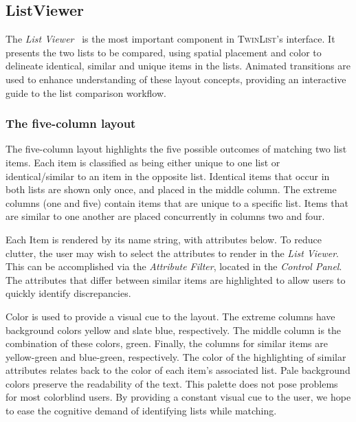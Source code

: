 \documentclass{chi2009}
\newcommand{\TwinList}{\textsc{TwinList}}
\newcommand{\ListViewer}{\textit{List Viewer}}
\newcommand{\Controls}{\textit{Control Panel}}
\newcommand{\AttributeFilter}{\textit{Attribute Filter}}
\begin{document}
\subsection{ListViewer}
The  \ListViewer~ is the most important component in \TwinList's interface. It presents the two lists to be compared, using spatial placement and color to delineate identical, similar and unique items in the lists. Animated transitions are used to enhance understanding of these layout concepts, providing an interactive guide to the list comparison workflow.

\subsubsection{The five-column layout}
The five-column layout highlights the five possible outcomes of matching two list items. Each item is classified as being either unique to one list or identical/similar to an item in the opposite list. Identical items that occur in both lists are shown only once, and placed in the middle column. The extreme columns (one and five) contain items that are unique to a specific list. Items that are similar to one another are placed concurrently in columns two and four.

Each Item is rendered by its name string, with attributes below. To reduce clutter, the user may wish to select the attributes to render in the \ListViewer. This can be accomplished via the \AttributeFilter, located in the \Controls. The attributes that differ between similar items are highlighted to allow users to quickly identify discrepancies.

Color is used to provide a visual cue to the layout. The extreme columns have background colors yellow and slate blue, respectively. The middle column is the combination of these colors, green. Finally, the columns for similar items are yellow-green and blue-green, respectively. The color of the highlighting of similar attributes relates back to the color of each item's associated list. Pale background colors preserve the readability of the text. This palette does not pose problems for most colorblind users. By providing a constant visual cue to the user, we hope to ease the cognitive demand of identifying lists while matching.
\end{document}
